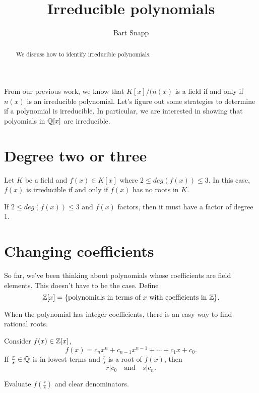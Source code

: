 \documentclass{ximera}
\author{Bart Snapp}
\title{Irreducible polynomials}
\begin{document}
\begin{abstract}
  We discuss how to identify irreducible polynomials.
\end{abstract}
\maketitle

From our previous work, we know that $K[x]/(n(x)$ is a field if and
only if $n(x)$ is an irreducible polynomial. Let's figure out some
strategies to determine if a polynomial is irreducible. In particular,
we are interested in showing that polyomials in $\mathbb Q[x]$ are
irreducible.

\section{Degree two or three}

\begin{lemma}
  Let $K$ be a field and $f(x)\in K[x]$ where $2 \le deg(f(x))\le 3$. In
  this case, $f(x)$ is irreducible if and only if $f(x)$ has no roots
  in $K$.
  \begin{sketch}
    If $2 \le deg(f(x))\le 3$ and $f(x)$ factors, then it must have a
    factor of degree $1$.
  \end{sketch}
\end{lemma}






\section{Changing coefficients}

So far, we've been thinking about polynomials whose coefficients are
field elements. This doesn't have to be the case. Define
\[
\mathbb Z[x] = \{\text{polynomials in terms of $x$ with coefficients in
  $\mathbb Z$}\}.
\]

When the polynomial has integer coefficients, there is an easy way to
find rational roots.

\begin{lemma}
  Consider $f(x) \in \mathbb Z[x]$,
  \[
  f(x) = c_nx^n + c_{n-1}x^{n-1} + \cdots + c_1 x + c_0.
  \]
  If $\frac{r}{s}\in\mathbb Q$ is in lowest terms and $\frac{r}{s}$ is a root
  of $f(x)$, then
  \[
  r | c_0 \quad\text{and}\quad s | c_n.
  \]
  \begin{sketch}
    Evaluate $f\left(\frac{r}{s}\right)$ and clear denominators.
  \end{sketch}
\end{lemma}
\end{document}
